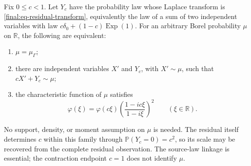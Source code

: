 \begin{theorem}
\label{final:P9}
Fix $0\leq c<1$.  Let $Y_c$ have the probability law whose Laplace
transform is \eqref{final:eq-residual-transform}, equivalently the
law of a sum of two independent variables with law
$c\delta_0+(1-c)\operatorname{Exp}(1)$.
For an arbitrary Borel probability $\mu$ on $\mathbb R$, the
following are equivalent:
\begin{enumerate}
\item $\mu=\mu_\Gamma$;
\item there are independent variables $X'$ and $Y_c$, with
      $X'\sim\mu$, such that $cX'+Y_c\sim\mu$;
\item the characteristic function of $\mu$ satisfies
      \[
      \varphi(\xi)=\varphi(c\xi)
          \left(\frac{1-ic\xi}{1-i\xi}\right)^2
                         \qquad(\xi\in\mathbb R).
      \]
\end{enumerate}
No support, density, or moment assumption on $\mu$ is needed.
The residual itself determines $c$ within this family through
$\mathbb P(Y_c=0)=c^2$, so its scale may be recovered from the
complete residual observation.  The source-law linkage is essential;
the contraction endpoint $c=1$ does not identify $\mu$.
\end{theorem}
